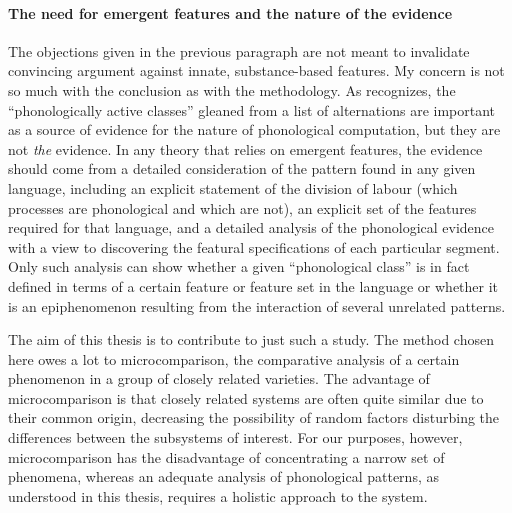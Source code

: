 \paragraph{The need for emergent features and the nature of the evidence}
\label{sec:need-emerg-feat}

The objections given in the previous paragraph are not meant to invalidate  convincing argument against innate, substance\hyp based features. My concern is not so much with the conclusion as with the methodology. As \citet{mielke-diss} recognizes, the \enquote{phonologically active classes} gleaned from a list of alternations are important as a source of evidence for the nature of phonological computation, but they are not \emph{the} evidence. In any theory that relies on emergent features, the evidence should come from a detailed consideration of the pattern found in any given language, including an explicit statement of the division of labour (\ie which processes are phonological and which are not), an explicit set of the features required for that language, and a detailed analysis of the phonological evidence with a view to discovering the featural specifications of each particular segment. Only such analysis can show whether a given \enquote{phonological class} is in fact defined in terms of a certain feature or feature set in the language or whether it is an epiphenomenon resulting from the interaction of several unrelated patterns.

The aim of this thesis is to contribute to just such a study. The method chosen here owes a lot to microcomparison, \ie the comparative analysis of a certain phenomenon in a group of closely related varieties. The advantage of microcomparison is that closely related systems are often quite similar due to their common origin, decreasing the possibility of random factors disturbing the differences between the subsystems of interest. For our purposes, however, microcomparison has the disadvantage of concentrating a narrow set of phenomena, whereas an adequate analysis of phonological patterns, as understood in this thesis, requires a holistic approach to the system.

